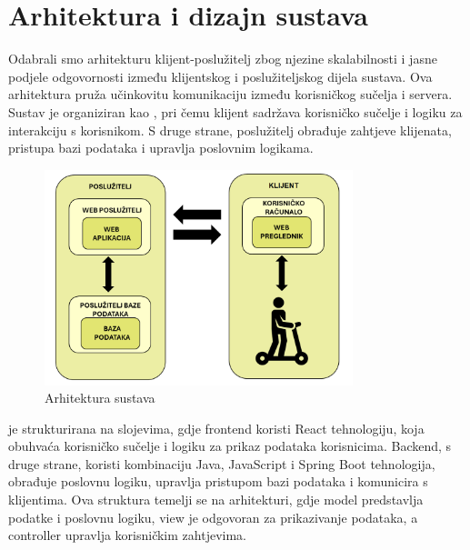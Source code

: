 \chapter{Arhitektura i dizajn sustava}
		
		\indent Odabrali smo arhitekturu klijent-poslužitelj zbog njezine skalabilnosti i jasne podjele odgovornosti između klijentskog i poslužiteljskog dijela sustava. Ova arhitektura pruža učinkovitu komunikaciju između korisničkog sučelja i servera. \\
		
		\indent Sustav je organiziran kao \textit{}, pri čemu klijent sadržava korisničko sučelje i logiku za interakciju s korisnikom. S druge strane, poslužitelj obrađuje zahtjeve klijenata, pristupa bazi podataka i upravlja poslovnim logikama. \\
		
		\begin{figure}[H]
			\centering
			\includegraphics[width=0.8\textwidth]{slike/arhitektura.png}
			\caption{Arhitektura sustava}
			\label{fig:your_label}
		\end{figure}
		
		\indent \textit{} je strukturirana na slojevima, gdje frontend koristi React tehnologiju, koja obuhvaća korisničko sučelje i logiku za prikaz podataka korisnicima. Backend, s druge strane, koristi kombinaciju Java, JavaScript i Spring Boot tehnologija, obrađuje poslovnu logiku, upravlja pristupom bazi podataka i komunicira s klijentima. Ova struktura temelji se na \textit{} arhitekturi, gdje model predstavlja podatke i poslovnu logiku, view je odgovoran za prikazivanje podataka, a controller upravlja korisničkim zahtjevima. \\
		
